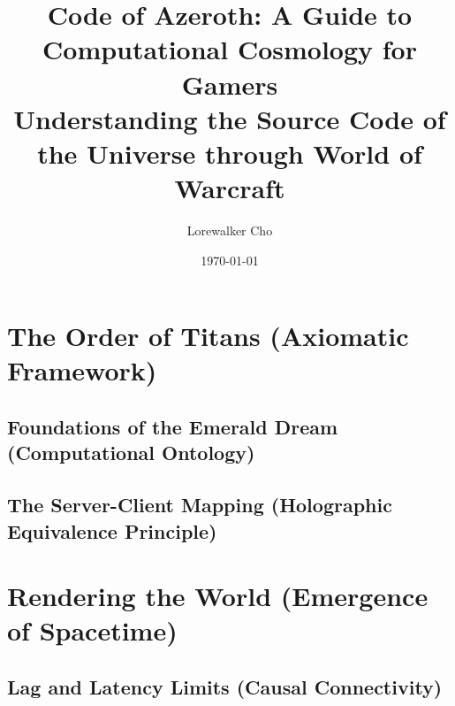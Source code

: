 \documentclass[11pt,a4paper,twoside]{book}
\title{Code of Azeroth: A Guide to Computational Cosmology for Gamers\\[0.5em]
\large Understanding the Source Code of the Universe through World of Warcraft}
\author{Lorewalker Cho}
\date{\today}
\begin{document}
\maketitle
\thispagestyle{empty}

\frontmatter

\tableofcontents



\mainmatter

\part{The Order of Titans (Axiomatic Framework)}

\chapter{Foundations of the Emerald Dream (Computational Ontology)}




\chapter{The Server-Client Mapping (Holographic Equivalence Principle)}




\part{Rendering the World (Emergence of Spacetime)}

\chapter{Lag and Latency Limits (Causal Connectivity)}


\end{document}

